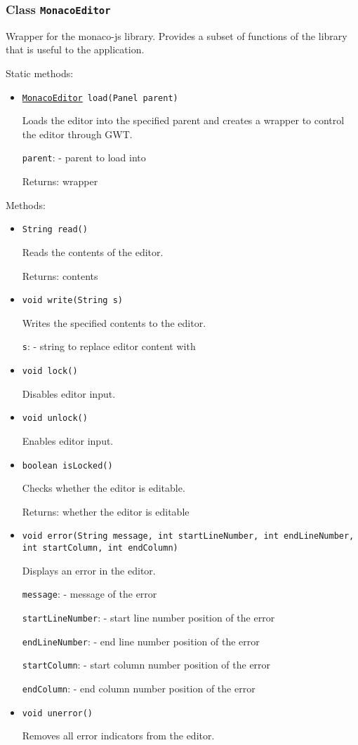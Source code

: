 \subsubsection{Class \texttt{MonacoEditor}}
\label{type:edu.kit.wavelength.client.view.gwt.MonacoEditor}
Wrapper for the monaco-js library.
 Provides a subset of functions of the library that is useful to the application.

Static methods:
\begin{itemize}
\item \texttt{\hyperref[type:edu.kit.wavelength.client.view.gwt.MonacoEditor]{MonacoEditor} load(Panel parent)}

Loads the editor into the specified parent and creates a wrapper to control the editor through GWT.

\texttt{parent}: - parent to load into

Returns: wrapper

\end{itemize}

Methods:
\begin{itemize}
\item \texttt{String read()}

Reads the contents of the editor.

Returns: contents

\item \texttt{void write(String s)}

Writes the specified contents to the editor.

\texttt{s}: - string to replace editor content with

\item \texttt{void lock()}

Disables editor input.

\item \texttt{void unlock()}

Enables editor input.

\item \texttt{boolean isLocked()}

Checks whether the editor is editable.

Returns: whether the editor is editable

\item \texttt{void error(String message, int startLineNumber, int endLineNumber, int startColumn, int endColumn)}

Displays an error in the editor.

\texttt{message}: - message of the error

\texttt{startLineNumber}: - start line number position of the error

\texttt{endLineNumber}: - end line number position of the error

\texttt{startColumn}: - start column number position of the error

\texttt{endColumn}: - end column number position of the error

\item \texttt{void unerror()}

Removes all error indicators from the editor.

\end{itemize}

